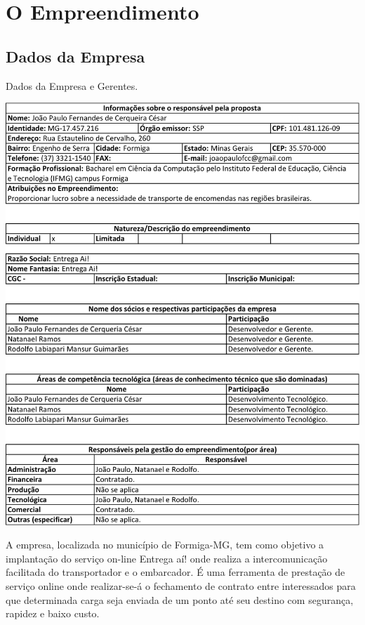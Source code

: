 \chapter{O Empreendimento}
\label{cap:OEmpreendimento}
	
	
	\section{Dados da Empresa}
	
		\begin{table}[htbp!]
			\centering
			\caption{Dados da Empresa e Gerentes.}
			\label{fig:processoBusca}
			\includegraphics[width=1\linewidth]{img/1-1.png}
		\end{table}
		\FloatBarrier
	
		A empresa, localizada no município de Formiga-MG, tem como objetivo a implantação do serviço on-line Entrega aí! onde realiza a intercomunicação facilitada do transportador e o embarcador. É uma ferramenta de prestação de serviço online onde realizar-se-á o fechamento de contrato entre interessados para que determinada carga seja enviada de um ponto até seu destino com segurança, rapidez e baixo custo.
		
